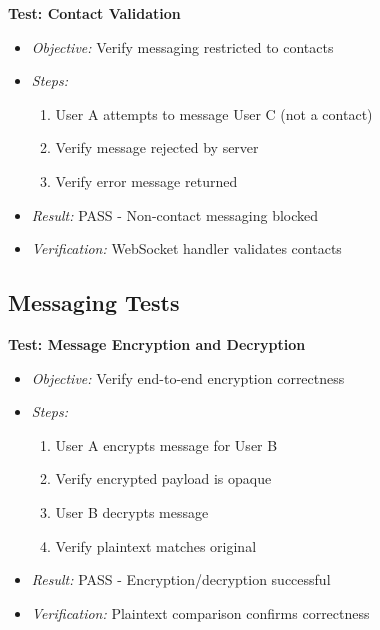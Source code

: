 \textbf{Test: Contact Validation}
\begin{itemize}
    \item \textit{Objective:} Verify messaging restricted to contacts
    \item \textit{Steps:}
    \begin{enumerate}
        \item User A attempts to message User C (not a contact)
        \item Verify message rejected by server
        \item Verify error message returned
    \end{enumerate}
    \item \textit{Result:} PASS - Non-contact messaging blocked
    \item \textit{Verification:} WebSocket handler validates contacts
\end{itemize}

\subsection{Messaging Tests}

\textbf{Test: Message Encryption and Decryption}
\begin{itemize}
    \item \textit{Objective:} Verify end-to-end encryption correctness
    \item \textit{Steps:}
    \begin{enumerate}
        \item User A encrypts message for User B
        \item Verify encrypted payload is opaque
        \item User B decrypts message
        \item Verify plaintext matches original
    \end{enumerate}
    \item \textit{Result:} PASS - Encryption/decryption successful
    \item \textit{Verification:} Plaintext comparison confirms correctness
\end{itemize}

